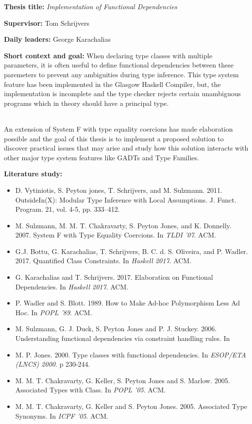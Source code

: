 \documentclass[12pt]{report}
\begin{document}
\pagestyle{myheadings}

{\bf Thesis title:} {\em Implementation of Functional Dependencies}

\vspace{0.5cm}
{\bf Supervisor:} Tom Schrijvers


\vspace{0.5cm}
{\bf Daily leaders:} George Karachalias

\vspace{1cm}
{\bf Short context and goal: }
When declaring type classes with multiple parameters, it is often useful to
define functional dependencies between these paremeters to prevent any
ambiguities during type inference. This type system feature has been implemented
in the Glasgow Haskell Compiler, but, the implementation is incomplete and the
type checker rejects certain unambiguous programs which in theory should have a
principal type.

\mbox{}\\
An extension of System F with type equality coercions has made elaboration
possible and the goal of this thesis is to implement a proposed solution to
discover practical issues that may arise and study how this solution interacts
with other major type system features like GADTs and Type Families.

\vspace{1cm}
{\bf Literature study:}
\begin{itemize}
\item
  D. Vytiniotis, S. Peyton jones, T. Schrijvers, and M. Sulzmann. 2011.
  OutsideIn(X): Modular Type Inference with Local Assumptions. J. Funct.
  Program. 21, vol. 4-5, pp. 333--412.
\item
  M. Sulzmann, M. M. T. Chakravarty, S. Peyton Jones, and K. Donnelly. 2007.
  System F with Type Equality Coercions.
  In \textit{TLDI '07}. ACM.
\item
  G.J. Bottu, G. Karachalias, T. Schrijvers, B. C. d. S. Oliveira, and P. Wadler. 2017.
  Quantified Class Constraints.
  In \textit{Haskell 2017}. ACM.
\item
  G. Karachalias and T. Schrijvers. 2017.
  Elaboration on Functional Dependencies. %
  In \textit{Haskell 2017}. ACM.
\item
  P. Wadler and S. Blott. 1989.
  How to Make Ad-hoc Polymorphism Less Ad Hoc.
  In \textit{POPL '89}. ACM.
\item
  M. Sulzmann, G. J. Duck, S. Peyton Jones and P. J. Stuckey. 2006.
  Understanding functional dependencies via constraint handling rules.
  In %
\item
  M. P. Jones. 2000.
  Type classes with functional dependencies.
  In \textit{ESOP/ETA (LNCS) 2000}. p 230-244.
\item
  M. M. T. Chakravarty, G. Keller, S. Peyton Jones and S. Marlow. 2005.
  Associated Types with Class.
  In \textit{POPL '05}. ACM.
\item
  M. M. T. Chakravarty, G. Keller and S. Peyton Jones. 2005.
  Associated Type Synonyms.
  In \textit{ICPF '05}. ACM.
\end{itemize}
\end{document}
